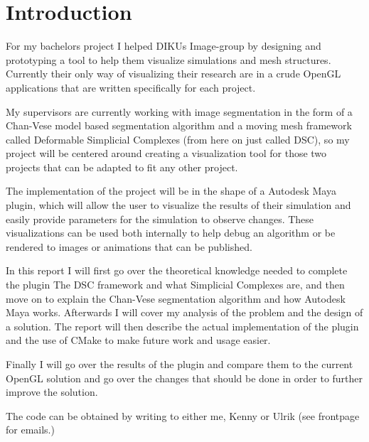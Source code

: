 \section{Introduction}

For my bachelors project I helped DIKUs Image-group by designing and
prototyping a tool to help them visualize simulations and mesh
structures. Currently their only way of visualizing their research are in a crude
OpenGL applications that are written specifically for each project.

My supervisors are currently working with image segmentation in the form of a
Chan-Vese model based segmentation algorithm and a moving mesh framework called
Deformable Simplicial Complexes (from here on just called DSC), so my project
will be centered around creating a visualization tool for those two projects
that can be adapted to fit any other project.

The implementation of the project will be in the shape of a Autodesk Maya plugin,
which will allow the user to visualize the results of their simulation and
easily provide parameters for the simulation to observe changes. These
visualizations can be used both internally to help debug an algorithm or be
rendered to images or animations that can be published.


In this report I will first go over the theoretical knowledge needed to complete
the plugin The DSC framework and what Simplicial Complexes are, and then
move on to explain the Chan-Vese segmentation algorithm and how Autodesk Maya
works. Afterwards I will cover my analysis of the problem and the design of a
solution. The report will then describe the actual implementation of the plugin
and the use of CMake to make future work and usage easier.

Finally I will go over the results of the plugin and compare them to the
current OpenGL solution and go over the changes that should be done in order to
further improve the solution.

The code can be obtained by writing to either me, Kenny or Ulrik (see frontpage
for emails.)

%
